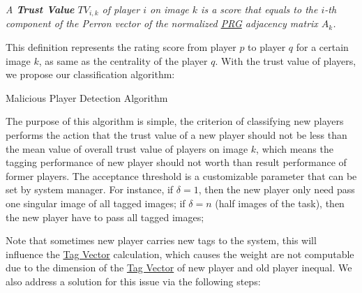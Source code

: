 \begin{definition}
\emph{
A \textbf{Trust Value} $TV_{i,k}$ of player $i$ on image $k$ is a score that
equals to the $i$-th component of the Perron vector of the normalized \hyperref[idx:prg]{PRG} adjacency matrix $A_k$.
}
\end{definition}

This definition represents the rating score from player $p$ to player $q$ for a certain image $k$, as same as the centrality
of the player $q$. With the trust value of players, we propose our classification algorithm:

\begin{algorithm}[H]
\label{algo:malicious}
\SetAlgoLined
{}
\caption{Malicious Player Detection Algorithm}
\end{algorithm}

The purpose of this algorithm is simple, the criterion of classifying new players performs the action that 
the trust value of a new player should not be less than the mean value of overall trust value of players on image $k$, 
which means the tagging performance of new player should not worth than result performance of former players.
The acceptance threshold is a customizable parameter that can be set by system manager.
For instance, if $\delta = 1$, then the new player only need pass one singular image of all tagged images; 
if $\delta = n$ (half images of the task), then the new player have to pass all tagged images;

Note that sometimes new player carries new tags to the system, this will influence the \hyperref[def:tagv]{Tag Vector} calculation,
which causes the weight are not computable due to 
the dimension of the \hyperref[def:tagv]{Tag Vector} of new player and old player inequal.
We also address a solution for this issue via the following steps:

